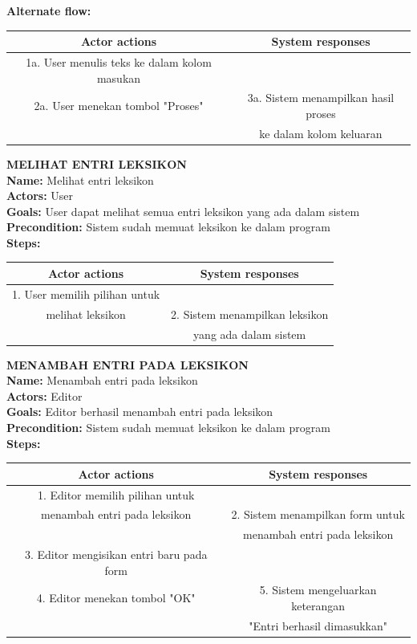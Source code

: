 \textbf{Alternate flow:}

\begin{table}[H]
\centering
\begin{tabular}{|c|c|}
\hline
\textbf{Actor actions} & \textbf{System responses} \\
\hline
1a. User menulis teks ke dalam kolom masukan&\\
2a. User menekan tombol "Proses"&3a. Sistem menampilkan hasil proses\\&ke dalam kolom keluaran\\
\hline
\end{tabular}
\end{table}

\textbf{MELIHAT ENTRI LEKSIKON}\\
\textbf{Name:} Melihat entri leksikon\\
\textbf{Actors:} User\\
\textbf{Goals:} User dapat melihat semua entri leksikon yang ada dalam sistem\\
\textbf{Precondition:} Sistem sudah memuat leksikon ke dalam program\\
\textbf{Steps:}

\begin{table}[H]
\centering
\begin{tabular}{|c|c|}
\hline
\textbf{Actor actions} & \textbf{System responses} \\
\hline
1. User memilih pilihan untuk&\\melihat leksikon&
2. Sistem menampilkan leksikon\\&yang ada dalam sistem \\
\hline
\end{tabular}
\end{table}

\textbf{MENAMBAH ENTRI PADA LEKSIKON}\\
\textbf{Name:} Menambah entri pada leksikon\\
\textbf{Actors:} Editor\\
\textbf{Goals:} Editor berhasil menambah entri pada leksikon\\
\textbf{Precondition:} Sistem sudah memuat leksikon ke dalam program\\
\textbf{Steps:}

\begin{table}[H]
\centering
\begin{tabular}{|c|c|}
\hline
\textbf{Actor actions} & \textbf{System responses} \\
\hline
1. Editor memilih pilihan untuk&\\ menambah entri pada leksikon&
2. Sistem menampilkan form untuk \\&menambah entri pada leksikon\\
3. Editor mengisikan entri baru pada form&\\
4. Editor menekan tombol "OK"&
5. Sistem mengeluarkan keterangan \\&"Entri berhasil dimasukkan"\\
\hline
\end{tabular}
\end{table}

